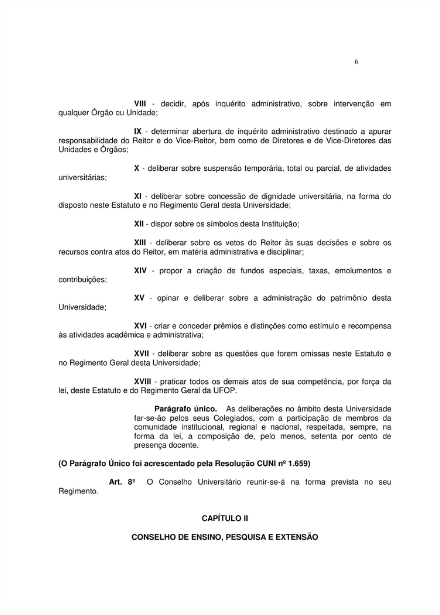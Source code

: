 \begin{figure}[p]
	\centering 
	\includegraphics[scale=0.7]{capitulos/resolucoes/cuni414/cuni414-6.pdf}
\end{figure}

